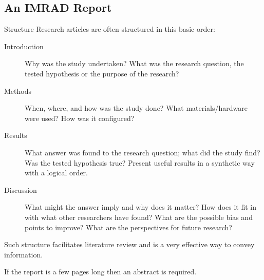 \documentclass[xcolor=x11names,compress,8pt]{beamer}
\renewcommand{\(}{\begin{columns}}
\renewcommand{\)}{\end{columns}}
\newcommand{\<}[1]{\begin{column}{#1}}
\renewcommand{\>}{\end{column}}
\begin{document}
\subsection{An IMRAD Report }
\label{sec-3-1}
\begin{frame}[label=sec-3-1-1]{Structure}
Research articles are often structured in this basic order:
\begin{description}
\item[{Introduction}] Why was the study undertaken? What was the research
question, the tested hypothesis or the purpose of
the research?
\item[{Methods}] When, where, and how was the study done? What
materials/hardware were used? How was it configured?
\item[{Results}] What answer was found to the research question; what did
the study find? Was the tested hypothesis true? \alert{Present
useful results in a synthetic way with a logical order}.
\item[{Discussion}] What might the answer imply and why does it matter?
How does it fit in with what other researchers have
found? What are the possible bias and points to
improve? What are the perspectives for future
research?
\end{description}

Such structure \alert{facilitates literature review} and is a very effective
way to convey information.

If the report is a few pages long then \alert{an abstract is required}.
\end{frame}
\end{document}
